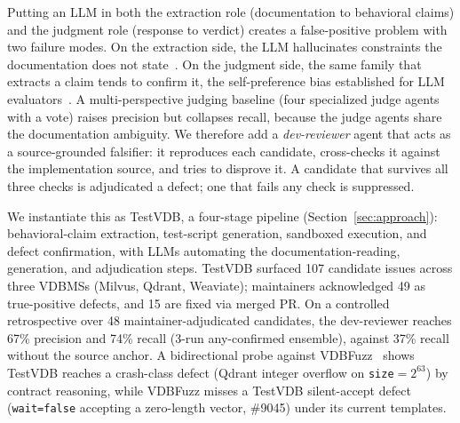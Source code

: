 \documentclass[sigconf]{acmart}
\begin{document}
Putting an LLM in both the extraction role (documentation to behavioral claims) and the judgment role (response to verdict) creates a false-positive problem with two failure modes. On the extraction side, the LLM hallucinates constraints the documentation does not state~\cite{ji23hall}. On the judgment side, the same family that extracts a claim tends to confirm it, the self-preference bias established for LLM evaluators~\cite{panickssery24}. A multi-perspective judging baseline (four specialized judge agents with a vote) raises precision but collapses recall, because the judge agents share the documentation ambiguity. We therefore add a \emph{dev-reviewer} agent that acts as a source-grounded falsifier: it reproduces each candidate, cross-checks it against the implementation source, and tries to disprove it. A candidate that survives all three checks is adjudicated a defect; one that fails any check is suppressed.

We instantiate this as TestVDB, a four-stage pipeline (Section~\ref{sec:approach}): behavioral-claim extraction, test-script generation, sandboxed execution, and defect confirmation, with LLMs automating the documentation-reading, generation, and adjudication steps. TestVDB surfaced 107 candidate issues across three VDBMSs (Milvus, Qdrant, Weaviate); maintainers acknowledged 49 as true-positive defects, and 15 are fixed via merged PR. On a controlled retrospective over 48 maintainer-adjudicated candidates, the dev-reviewer reaches 67\% precision and 74\% recall (3-run any-confirmed ensemble), against 37\% recall without the source anchor. A bidirectional probe against VDBFuzz~\cite{vdbfuzz26} shows TestVDB reaches a crash-class defect (Qdrant integer overflow on \texttt{size}$=2^{63}$) by contract reasoning, while VDBFuzz misses a TestVDB silent-accept defect (\texttt{wait=false} accepting a zero-length vector, \#9045) under its current templates.
\end{document}
